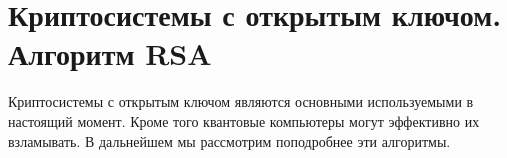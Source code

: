 \chapter{Криптосистемы с открытым ключом. Алгоритм RSA}
Криптосистемы с открытым ключом являются основными используемыми в
настоящий момент. Кроме того квантовые компьютеры могут эффективно их
взламывать. В дальнейшем мы рассмотрим поподробнее эти алгоритмы.





